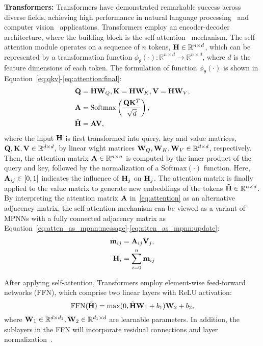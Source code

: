 \textbf{Transformers:}
Transformers have demonstrated remarkable success across diverse fields, achieving high performance in natural language processing~\cite{devlin-etal-2019-bert} and computer vision~\cite{dosovitskiy2021an} applications. 
Transformers employ an encoder-decoder architecture, 
where the building block is the self-attention~\cite{vaswani2017attention} mechanism.
The self-attention module operates on a sequence of $n$ tokens, $\mathbf{H} \in \mathbb{R}^{n\times d}$, which can be represented by a transformation function $\phi_\theta(\cdot) : \mathbb{R}^{n \times d} \rightarrow \mathbb{R}^{n \times d}$, where $d$ is the feature dimensions of each token. 
The formulation of function $\phi_\theta(\cdot)$ is shown in Equation~\eqref{eq:qkv}-\eqref{eq:attention:final}:
\begin{align}
\mathbf{Q} &= \mathbf{H} \mathbf{W}_{Q}, \mathbf{K} = \mathbf{H} \mathbf{W}_{K}, \mathbf{V} = \mathbf{H} \mathbf{W}_{V}, \label{eq:qkv}\\
\mathbf{A} &= \text{Softmax}\left(\frac{\mathbf{Q}\mathbf{K}^{T}}{\sqrt{d}}\right), \label{eq:attention}\\
\Tilde{\mathbf{H}} &= \mathbf{A} \mathbf{V}, \label{eq:attention:final}
\end{align}
where the input $\mathbf{H}$ is first transformed into query, key and value matrices, $\mathbf{Q}, \mathbf{K}, \mathbf{V} \in \mathbb{R}^{d\times d}$, by linear wight matrices $\mathbf{W}_{Q}, \mathbf{W}_{K}, \mathbf{W}_{V} \in \mathbb{R}^{d\times d}$, respectively. 
Then, the attention matrix $\mathbf{A} \in \mathbb{R}^{n \times n}$ is computed by the inner product of the query and key, followed by the normalization of a $\text{Softmax}(\cdot)$ function.
Here, $\mathbf{A}_{ij} \in [0, 1]$ indicates the influence of $\mathbf{H}_j$ on $\mathbf{H}_j$.
The attention matrix is finally applied to the value matrix to generate new embeddings of the tokens $\Tilde{\mathbf{H}} \in \mathbb{R}^{n \times d}$. 
By interpreting the attention matrix $\mathbf{A}$ in~\cref{eq:attention} as an alternative adjacency matrix, the self-attention mechanism can be viewed as a variant of MPNNs with a fully connected adjacency matrix as Equation~\eqref{eq:atten_as_mpnn:message}-\eqref{eq:atten_as_mpnn:update}:
\begin{align}
    \label{eq:atten_as_mpnn:message}
    \mathbf{m}_{ij} &= \mathbf{A}_{ij} \mathbf{V}_{j},\\\label{eq:atten_as_mpnn:update}
    \mathbf{H}_{i} &= \sum_{i=0}^{n} \mathbf{m}_{ij}
\end{align}

After applying self-attention, Transformers employ element-wise feed-forward networks (FFN), which comprise two linear layers with ReLU activation:
\begin{equation}
    \text{FFN}(\Tilde{\mathbf{H}}) = \text{max}(0, \Tilde{\mathbf{H}}\mathbf{W}_{1} + b_{1})\mathbf{W}_{2} + b_{2},
\end{equation}
where $\mathbf{W}_{1} \in \mathbb{R}^{d\times d_{1}}, \mathbf{W}_{2} \in \mathbb{R}^{d_{1}\times d}$ are learnable parameters. In addition, the sublayers in the FFN will incorporate residual connections and layer normalization~\cite{ba2016layer}.

